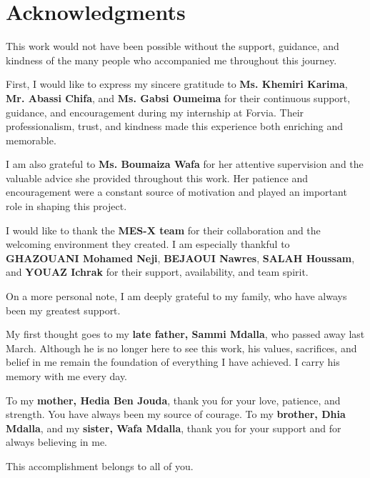 \chapter*{Acknowledgments}

This work would not have been possible without the support, guidance, and kindness of the many people who accompanied me throughout this journey.

First, I would like to express my sincere gratitude to \textbf{Ms. Khemiri Karima}, \textbf{Mr. Abassi Chifa}, and \textbf{Ms. Gabsi Oumeima} for their continuous support, guidance, and encouragement during my internship at Forvia. Their professionalism, trust, and kindness made this experience both enriching and memorable.

I am also grateful to \textbf{Ms. Boumaiza Wafa} for her attentive supervision and the valuable advice she provided throughout this work. Her patience and encouragement were a constant source of motivation and played an important role in shaping this project.

I would like to thank the \textbf{MES-X team} for their collaboration and the welcoming environment they created. I am especially thankful to \textbf{GHAZOUANI Mohamed Neji}, \textbf{BEJAOUI Nawres}, \textbf{SALAH Houssam}, and \textbf{YOUAZ Ichrak} for their support, availability, and team spirit.

On a more personal note, I am deeply grateful to my family, who have always been my greatest support.

My first thought goes to my \textbf{late father, Sammi Mdalla}, who passed away last March. Although he is no longer here to see this work, his values, sacrifices, and belief in me remain the foundation of everything I have achieved. I carry his memory with me every day.

To my \textbf{mother, Hedia Ben Jouda}, thank you for your love, patience, and strength. You have always been my source of courage. To my \textbf{brother, Dhia Mdalla}, and my \textbf{sister, Wafa Mdalla}, thank you for your support and for always believing in me.

This accomplishment belongs to all of you.
